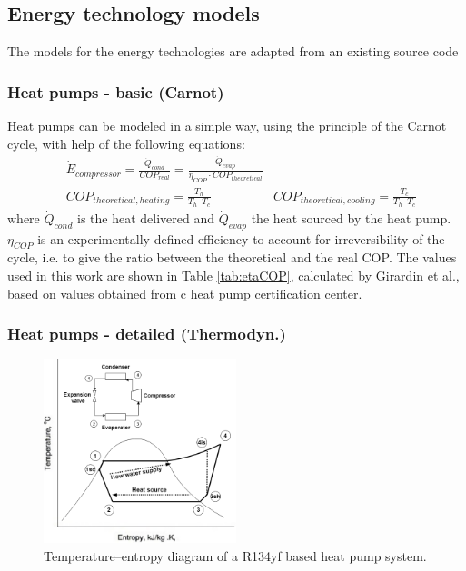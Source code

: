 \documentclass{article}
\begin{document}
\subsection{Energy technology models}\label{ss:et}
The models for the energy technologies are adapted from an existing source code \cite{suciuEnergyautonomousCitiesUsing2016a}

\subsubsection{Heat pumps - basic (Carnot)}\label{sss:hp_carnot}
Heat pumps can be modeled in a simple way, using the principle of the Carnot cycle, with help of the following equations:
\begin{align}
    & \dot{E}_{compressor} = \frac{\dot{Q}_{cond}}{COP_{real}} = \frac{\dot{Q}_{evap}}{\eta_{COP} \cdot COP_{theoretical}} \\
    & COP_{theoretical, heating} =  \frac{T_{h}}{T_{h} – T_{c}}  
    & COP_{theoretical, cooling} =  \frac{T_{c}}{T_{h} – T_{c}} 
\end{align}
where $\dot{Q}_{cond}$ is the heat delivered and $\dot{Q}_{evap}$ the heat sourced by the heat pump. $\eta_{COP}$ is an experimentally defined efficiency to account for irreversibility of the cycle, i.e. to give the ratio between the theoretical and the real COP. The values used in this work are shown in Table \ref{tab:etaCOP}, calculated by Girardin et al.\cite{girardinEnerGisGeographicalInformation2010}, based on values obtained from c heat pump certification center\cite{NTBBuchsInstitut}. \\



\subsubsection{Heat pumps - detailed (Thermodyn.)}\label{sss:hp_thermo}

\begin{figure}[htp]
	\centering
	\includegraphics[width=0.5\textwidth]{HP_cylce_ref.png}
	\caption{Temperature–entropy diagram of a R134yf based heat pump system.}
	\label{fig:hp_ref}
\end{figure}
\end{document}
